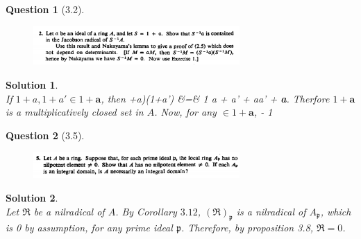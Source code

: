 \documentclass[11pt]{article}
\theoremstyle{plain}
\def\eQb#1\eQe{\begin{eqnarray*}#1\end{eqnarray*}}
\theoremstyle{quest}
\newtheorem*{question}{Question}
\newtheorem*{solution}{Solution}
\begin{document}
\bigskip

\begin{question}[3.2]
\hfill
\begin{figure}[h!]
  \centering
    \includegraphics[width=0.7\textwidth]{d-3-2.png}
\end{figure}
\end{question}
\begin{solution} \hfill \\
If $1+a, 1+a' \in 1+ \textbf{a}$, then
\eQb
(1+a)(1+a') &=& 1 a + a' + aa'  + \textbf{a}. 
\eQe 
Therfore $1+\textbf{a}$ is a multiplicatively closed set in $A$. Now,
for any $\in 1 + \textbf{a}$, 
\eQb
1 - 1
\eQe

\end{solution}

\newpage


\begin{question}[3.5]
\hfill
\begin{figure}[h!]
  \centering
    \includegraphics[width=0.7\textwidth]{d-3-5.png}
\end{figure}
\end{question}
\begin{solution} \hfill \\
Let $\mathfrak{R}$ be a nilradical of $A$. By Corollary $3.12$, 
$(\mathfrak{R})_{\mathfrak{p}}$ is a nilradical of $A_{\mathfrak{p}}$, which is 0 by
assumption, for any prime ideal $\mathfrak{p}$. Therefore, by proposition 3.8,
$\mathfrak{R} = 0$.

\smallskip

 
\end{solution}

\newpage
\end{document}
